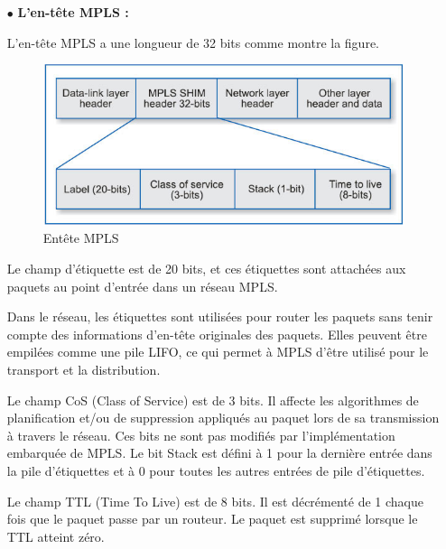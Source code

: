 \begin{itemize}
	\item[$\bullet$]\textbf{L'en-tête MPLS :} 
	
L'en-tête MPLS a une longueur de 32 bits comme montre la figure.
\begin{figure} [H]
	\begin{center}
		\centering
		\hspace*{-0.5cm}
		\includegraphics[width=0.67\linewidth]{Images/mpls entete}
	\end{center}
	\caption{Entête MPLS}
\end{figure} 

Le champ d'étiquette est de 20 bits, et ces étiquettes sont attachées aux paquets au point d'entrée dans un réseau MPLS. 

Dans le réseau, les étiquettes sont utilisées pour router les paquets sans tenir compte des informations d'en-tête originales des paquets. Elles peuvent être empilées comme une pile LIFO, ce qui permet à MPLS d'être utilisé pour le transport et la distribution.

Le champ CoS (Class of Service) est de 3 bits. Il affecte les algorithmes de planification et/ou de suppression appliqués au paquet lors de sa transmission à travers le réseau. Ces bits ne sont pas modifiés par l'implémentation embarquée de MPLS.
Le bit Stack est défini à 1 pour la dernière entrée dans la pile d'étiquettes et à 0 pour toutes les autres entrées de pile d'étiquettes.

Le champ TTL (Time To Live) est de 8 bits. Il est décrémenté de 1 chaque fois que le paquet passe par un routeur. Le paquet est supprimé lorsque le TTL atteint zéro. 
	
\end{itemize}
